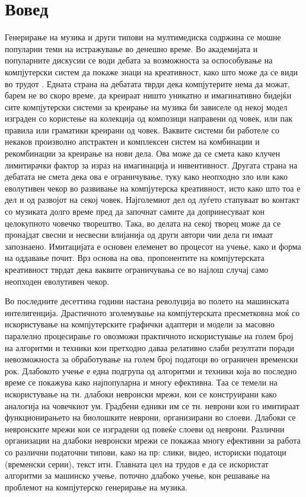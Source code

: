 \newpage
\chapter{Вовед}

Генерирање на музика и други типови на мултимедиска содржина се мошне популарни теми на истражување во денешно време. Во академијата и популарните дискусии се води дебата за возможноста за оспособување на компјутерски систем да покаже знаци на креативност, како што може да се види во трудот \cite{Ghedini2015}. Едната страна на дебатата тврди дека компјутерите нема да можат, барем не во скоро време, да креираат ништо уникатно и имагинативно бидејќи сите компјутерски системи за креирање на музика би зависеле од некој модел изграден со користење на колекција од композици направени од човек, или пак правила или граматики креирани од човек. Ваквите системи би работеле со некаков произволно апстрактен и комплексен систем на комбинации и рекомбинации за креирање на нови дела. Ова може да се смета како клучен лимитирачки фактор за израз на имагинација и инвентивност. Другата страна на дебатата не смета дека ова е ограничување, туку како неопходно зло или како еволутивен чекор во развивање на компјутерска креативност, исто како што тоа е дел и од развојот на секој човек. Најголемиот дел од луѓето стапуваат во контакт со музиката долго време пред да започнат самите да допринесуваат кон целокупното човечко творештво. Така, во делата на секој творец може да се пронајдат свесни и несвесни влијанија од други автори чии дела ги имаат запознаено. Имитацијата е основен елеменет во процесот на учење, како и форма на оддавање почит. Врз основа на ова, пропонентите на компјутерската креативност тврдат дека ваквите ограничувања се во најлош случај само неопходен еволутивен чекор.

Во последните десеттина години настана револуција во полето на машинската интелигенција. Драстичното зголемување на компјутерската пресметковна моќ со искористување на компјутерските графички адаптери и модели за масовно паралелно процесирање го овозможи практичното искористување на голем број на алгоритми и техники кои претходно даваа релативно слаби резултати поради невозможноста за обработување на голем број податоци во ограничен временски рок. Длабокото учење е една подгрупа од алгоритми и техники која во последно време се покажува како најпопуларна и многу ефективна. Таа се темели на искористување на тн. длабоки невронски мрежи, кои се конструирани како аналогија на човечкиот ум. Градбени едники им се тн. неврони кои го имитираат функционирањето на биолошките неврони, организирани во слоеви. Длабоки се невронските мрежи кои се изградени од повеќе слоеви од неврони. Различни организации на длабоки невронски мрежи се покажаа многу ефективни за работа со различни податочни типови, како на пр: слики, видео, историски податоци (временски серии), текст итн. Главната цел на трудов е да се искористат алгоритми за машинско учење, поточно длабоко учење, кон решавање на проблемот на компјутерско генерирање на музика.

